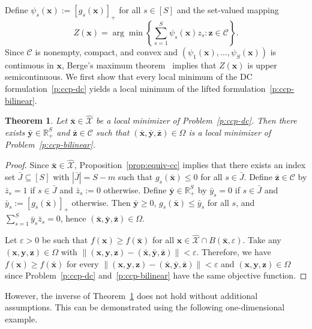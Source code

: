 \documentclass[11pt]{article}
\newtheorem{theorem}{Theorem}[section]
\def\bs{\boldsymbol}
\def\Re{\mathbb{R}}
\def\C{\mathcal{C}}
\def\X{\mathcal{X}}
\begin{document}
Define $\psi_s(\bs{x}):=[g_s(\bs{x})]_+$ for all $s\in[S]$ and the set-valued mapping
\[
Z(\bs{x})
=
\arg\min\left \{ \sum^S_{s=1}\psi_s(\bs{x}) z_s: \bs{z} \in \C \right\}.
\]
Since $\C$ is nonempty, compact, and convex and $(\psi_1(\bs{x}),\ldots,\psi_S(\bs{x}))$ is continuous in $\bs{x}$,
Berge's maximum theorem~\cite{berge1963topological} implies that $Z(\bs{x})$ is upper semicontinuous. We first show that every local minimum of the
DC formulation~\eqref{p:ccp-dc} yields a local minimum of the lifted formulation~\eqref{p:ccp-bilinear}.

\begin{theorem}\label{thm:equiv-local-P2Q}
Let $\bar{\bs{x}}\in\hat{\X}$ be a local minimizer of Problem~\eqref{p:ccp-dc}. Then there exists
$\bar{\bs{y}}\in\Re^S_+$ and $\bar{\bs{z}}\in\C$ such that
$(\bar{\bs{x}},\bar{\bs{y}},\bar{\bs{z}})\in\Omega$ is a local minimizer of Problem~\eqref{p:ccp-bilinear}.
\end{theorem}

\begin{proof}
Since $\bar{\bs{x}}\in\hat{\X}$, Proposition~\ref{prop:equiv-cc} implies that there exists an index set $\bar J\subseteq[S]$ with $|\bar J|=S-m$ such that $g_s(\bar{\bs{x}})\le 0$ for all $s\in\bar J$.
Define $\bar{\bs{z}}\in\C$ by $\bar z_s=1$ if $s\in\bar J$ and $\bar z_s:=0$ otherwise.
Define $\bar{\bs{y}}\in\Re^S_+$ by $\bar y_s=0$ if $s\in\bar J$ and $\bar y_s:=[g_s(\bar{\bs{x}})]_+$ otherwise.
Then $\bar{\bs{y}}\ge 0$, $g_s(\bar{\bs{x}})\le \bar y_s$ for all $s$, and $\sum_{s=1}^S \bar y_s\bar z_s=0$, hence
$(\bar{\bs{x}},\bar{\bs{y}},\bar{\bs{z}})\in\Omega$.

Let $\varepsilon>0$ be such that $f(\bs{x})\ge f(\bar{\bs{x}})$ for all $\bs{x}\in\hat{\X}\cap B(\bar{\bs{x}},\varepsilon)$.
Take any $(\bs{x},\bs{y},\bs{z})\in\Omega$ with
$\|(\bs{x},\bs{y},\bs{z})-(\bar{\bs{x}},\bar{\bs{y}},\bar{\bs{z}})\|<\varepsilon$. Therefore, we have $f(\bs{x}) \geq f(\bar{\bs{x}})$ for every $\|(\bs{x},\bs{y},\bs{z})-(\bar{\bs{x}},\bar{\bs{y}},\bar{\bs{z}})\|<\varepsilon$ and $(\bs{x},\bs{y},\bs{z})\in\Omega$ since Problem~\eqref{p:ccp-dc} and~\eqref{p:ccp-bilinear} have the same objective function.
\end{proof}

However, the inverse of Theorem~\ref{thm:equiv-local-P2Q} does not hold without additional assumptions. This can be demonstrated using the following one-dimensional example.
\end{document}
